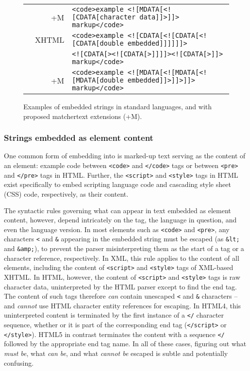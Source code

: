 \begin{figure*}
\begin{center}
\begin{footnotesize}
\begin{tabular}{lrl}
& +M	& \verb|<code>example <![MDATA[<![CDATA[character data]]>]]> markup</code>| \\
& XHTML	& \verb|<code>example <![CDATA[<![CDATA[<![CDATA[double embedded]]]]]]>| \\
&	& \verb|<![CDATA[><![CDATA[>]]]]><![CDATA[>]]> markup</code>| \\
& +M	& \verb|<code>example <![MDATA[<![MDATA[<![MDATA[double embedded]]>]]>]]> markup</code>| \\
\end{tabular}
\end{footnotesize}
\end{center}
\caption{Examples of embedded strings in standard \ml languages,
	and with proposed matchertext extensions (+M).}
\label{fig:ml-emb}
\end{figure*}


\subsubsection{Strings embedded as element content}

One common form of embedding into \ml 
is marked-up text serving as the content of an element:
\eg example code between \verb|<code>| and \verb|</code>| tags
or between \verb|<pre>| and \verb|</pre>| tags in HTML.
Further, the \verb|<script>| and \verb|<style>| tags in HTML
exist specifically to embed scripting language code
and cascading style sheet (CSS) code, respectively,
as their content.

The syntactic rules governing
what can appear in text embedded as element content,
however,
depend intricately on the tag, the \ml language in question,
and even the language version.
In most elements such as \verb|<code>| and \verb|<pre>|,
any characters \verb|<| and \verb|&| appearing in the embedded string
must be escaped (as \verb|&lt;| and \verb|&amp;|),
to prevent the \ml parser misinterpreting them as
the start of a tag or a character reference,
respectively.
In XML, this rule applies to the content of all elements,
including the content of \verb|<script>| and \verb|<style>| tags
of XML-based XHTML.
In HTML, however, the content of \verb|<script>| and \verb|<style>| tags
is raw character data,
uninterpreted by the HTML parser except to find the end tag.
The content of such tags therefore \emph{can} contain
unescaped \verb|<| and \verb|&| characters --
and \emph{cannot} use HTML character entity references for escaping.
In HTML4, this uninterpreted content is terminated
by the first instance of a \verb|</| character sequence,
whether or it is part of the corresponding end tag
(\verb|</script>| or \verb|</style>|).
HTML5 in contrast terminates the content with a sequence \verb|</|
followed by the appropriate end tag name.
In all of these cases, figuring out what \emph{must be},
what \emph{can be}, and what \emph{cannot be}
escaped is subtle and potentially confusing.

